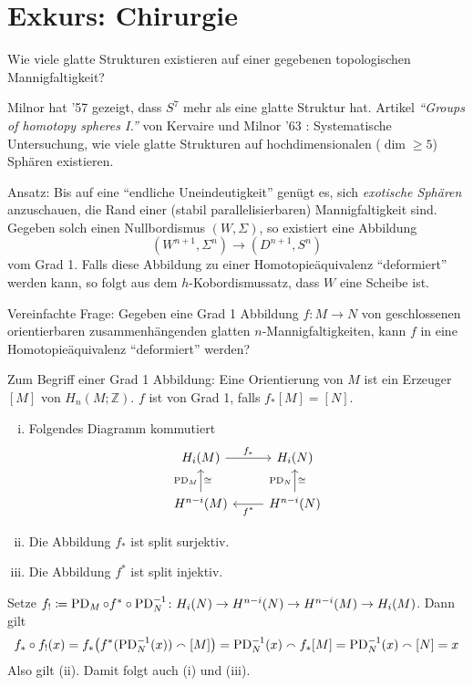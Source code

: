 \newpage




\section{Exkurs: Chirurgie} %
\label{sec:7}

\begin{frage}
	Wie viele glatte Strukturen existieren auf einer gegebenen topologischen Mannigfaltigkeit?
\end{frage}

Milnor hat '57 gezeigt, dass $S^7$ mehr als eine glatte Struktur hat. 
Artikel \emph{\enquote{Groups of homotopy spheres I.}} von Kervaire und Milnor '63 : Systematische Untersuchung, wie viele glatte Strukturen auf hochdimensionalen ($\dim \ge 5$) Sphären existieren. 

Ansatz: Bis auf eine \enquote{endliche Uneindeutigkeit} genügt es, sich \emph{exotische Sphären} anzuschauen, die Rand einer (stabil parallelisierbaren) Mannigfaltigkeit sind.
Gegeben solch einen Nullbordismus $(W,\Sigma)$, so existiert eine Abbildung 
\[
	(W^{n+1},\Sigma^n) \longrightarrow (D^{n+1},S^n) 
\]
vom Grad 1. 
Falls diese Abbildung zu einer Homotopieäquivalenz \enquote{deformiert} werden kann, so folgt aus dem $h$-Kobordismussatz, dass $W$ eine Scheibe ist.

Vereinfachte Frage: Gegeben eine Grad 1 Abbildung $f \colon M \to N$ von geschlossenen orientierbaren zusammenhängenden glatten $n$-Mannigfaltigkeiten, kann $f$ in eine Homotopieäquivalenz \enquote{deformiert} werden?

\begin{erinnerung}
	Zum Begriff einer Grad 1 Abbildung: Eine Orientierung von $M$ ist ein Erzeuger $[M]$ von $H_n(M;\mathbb{Z})$. 
	$f$ ist von Grad 1, falls $f_*[M]=[N]$.
\end{erinnerung}

\begin{lemma}[label=lem:ex:lem1]
	\begin{enumerate}[(i)]
		\item Folgendes Diagramm kommutiert
		\[
			\begin{tikzcd}
				H_i(M) \rar["f_*"] & H_i(N) \\
				H^{n-i}(M) \uar["\PD_M","\cong"'] & H^{n-i}(N) \lar["f^*"] \uar["\PD_N","\cong"']
			\end{tikzcd}
		\]
		\item Die Abbildung $f_*$ ist split surjektiv.
		\item Die Abbildung $f^*$ ist split injektiv.
	\end{enumerate}
\end{lemma}
\begin{beweis}
	Setze $f_! \coloneqq \PD_M \circ f^* \circ  \PD^{-1}_N \colon H_i(N) \to H^{n-i}(N) \to H^{n-i}(M) \to H_i(M)$.
	Dann gilt 
	\[
		f_* \circ f_!(x) = f_* \enbrace[\big]{f^* (\PD^{-1}_N(x)) \capp [M]} = \PD_N^{-1}(x) \capp f_*[M] = \PD_N^{-1}(x) \capp [N] = x
	\]
	Also gilt (ii).
	Damit folgt auch (i) und (iii).
\end{beweis}

